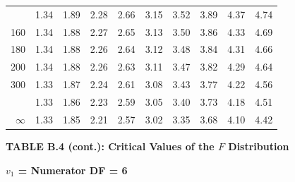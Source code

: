 \documentclass[10pt]{article}
\begin{document}
\begin{longtable}{@{}r!{\vrule width 0.8pt\hspace{0.55em}}rrrrrrrrr@{}}
 & 1.34 & 1.89 & 2.28 & 2.66 & 3.15 & 3.52 & 3.89 & 4.37 & 4.74 \\
160 & 1.34 & 1.88 & 2.27 & 2.65 & 3.13 & 3.50 & 3.86 & 4.33 & 4.69 \\
180 & 1.34 & 1.88 & 2.26 & 2.64 & 3.12 & 3.48 & 3.84 & 4.31 & 4.66 \\
200 & 1.34 & 1.88 & 2.26 & 2.63 & 3.11 & 3.47 & 3.82 & 4.29 & 4.64 \\
300 & 1.33 & 1.87 & 2.24 & 2.61 & 3.08 & 3.43 & 3.77 & 4.22 & 4.56 \\
 & 1.33 & 1.86 & 2.23 & 2.59 & 3.05 & 3.40 & 3.73 & 4.18 & 4.51 \\
$\infty$ & 1.33 & 1.85 & 2.21 & 2.57 & 3.02 & 3.35 & 3.68 & 4.10 & 4.42 \\
\end{longtable}
\newpage
\thispagestyle{empty}
\begin{center}
{\large\bfseries TABLE B.4 (cont.): Critical Values of the $F$ Distribution\par}
\end{center}
{\large\bfseries $v_1$ = Numerator DF = 6\par}
\vspace{0.5em}
\small
\end{document}

